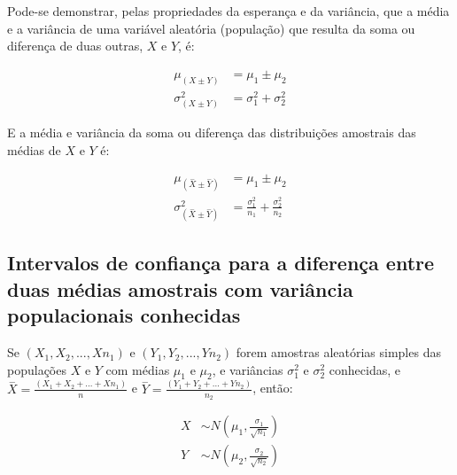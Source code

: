 \documentclass[
]{book}
\begin{document}
\hfill\break

Pode-se demonstrar, pelas propriedades da esperança e da variância, que a média e a variância de uma variável aleatória (população) que resulta da soma ou diferença de duas outras, \(X\) e \(Y\), é:

\hfill\break

\begin{align*}
\mu_{(X \pm Y)} & = \mu_{1} \pm \mu_{2}\\
\sigma^{2}_{(X \pm Y)} &  = \sigma_{1}^{2} + \sigma_{2}^{2}    
\end{align*}

\hfill\break

E a média e variância da soma ou diferença das distribuições amostrais das médias de \(X\) e \(Y\) é:

\hfill\break

\begin{align*}
\mu_{(\stackrel{-}{X} \pm \stackrel{-}{Y})} & = \mu_{1} \pm \mu_{2} \\    
\sigma^{2}_{(\stackrel{-}{X} \pm \stackrel{-}{Y})} & = \frac{\sigma_{1}^{2}}{n_{1}} + \frac{\sigma_{2}^{2}}{n_{2}}    
\end{align*}

\hfill\break

\hypertarget{intervalos-de-confianuxe7a-para-a-diferenuxe7a-entre-duas-muxe9dias-amostrais-com-variuxe2ncia-populacionais-conhecidas}{%
\subsection{Intervalos de confiança para a diferença entre duas médias amostrais com variância populacionais conhecidas}\label{intervalos-de-confianuxe7a-para-a-diferenuxe7a-entre-duas-muxe9dias-amostrais-com-variuxe2ncia-populacionais-conhecidas}}

\hfill\break

Se \((X_{1}, X_{2},...,X{n_{1}})\) e \((Y_{1}, Y_{2},...,Y{n_{2}})\) forem amostras aleatórias simples das populações \(X\) e \(Y\) com médias \(\mu_{1}\) e \(\mu_{2}\), e variâncias \(\sigma_{1}^{2}\) e \(\sigma_{2}^{2}\) conhecidas, e \(\stackrel{-}{X}=\frac{(X_{1}+X_{2}+...+X{n_{1}})}{n}\) e \(\stackrel{-}{Y}=\frac{(Y_{1}+Y_{2}+...+Y{n_{2}})}{n_{2}}\), então:

\hfill\break

\begin{align*}
{X} & \sim N( \mu_{1} ,  \frac{\sigma_{1}}{\sqrt{n_{1}}} ) \\
{Y} & \sim N( \mu_{2} ,  \frac{\sigma_{2}}{\sqrt{n_{2}}} )
\end{align*}
\end{document}
